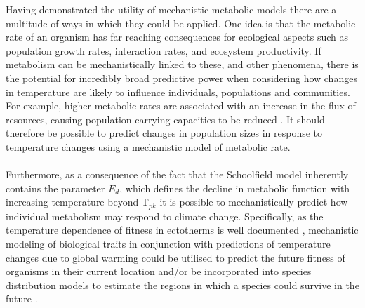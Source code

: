 \documentclass[11pt]{article}
\begin{document}
Having demonstrated the utility of mechanistic metabolic models there are a multitude of ways in which they could be applied. One idea is that the metabolic rate of an organism has far reaching consequences for ecological aspects such as population growth rates, interaction rates, and ecosystem productivity. If metabolism can be mechanistically linked to these, and other phenomena, there is the potential for incredibly broad predictive power when considering how changes in temperature are likely to influence individuals, populations and communities. For example, higher metabolic rates are associated with an increase in the flux of resources, causing population carrying capacities to be reduced \cite{brown2004toward, savage2004effects}. It should therefore be possible to predict changes in population sizes in response to temperature changes using a mechanistic model of metabolic rate. 
\\
\\
Furthermore, as a consequence of the fact that the Schoolfield model inherently contains the parameter \begin{math}E_d\end{math}, which defines the decline in metabolic function with increasing temperature beyond T\begin{math}_{pk}\end{math} it is possible to mechanistically predict how individual metabolism may respond to climate change. Specifically, as the temperature dependence of fitness in ectotherms is well documented \cite{martin2008suboptimal}, mechanistic modeling of biological traits in conjunction with predictions of temperature changes due to global warming could be utilised to predict the future fitness of organisms in their current location and/or be incorporated into species distribution models to estimate the regions in which a species could survive in the future \cite{thomas2012global}. 
\\
\\
\end{document}
